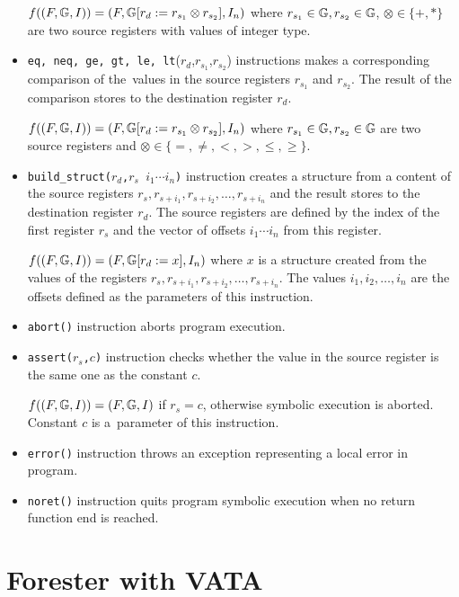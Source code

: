 \begin{itemize}
		$f((F, \mathbb{G}, I)) = (F, \mathbb{G} [r_d := r_{s_1} \otimes r_{s_2}], I_n)$
		where $r_{s_1} \in \mathbb{G}, r_{s_2} \in \mathbb{G}$, $\otimes \in \{+,*\}$
		are two source registers with values of integer type.

	\item {\tt eq, neq, ge, gt, le, lt}($r_d$,$r_{s_1}$,$r_{s_2}$) instructions
		makes a corresponding comparison of the~values in the source registers $r_{s_1}$
		and $r_{s_2}$.
		The result of the comparison stores to the destination register $r_d$.
		
		$f((F, \mathbb{G}, I)) = (F, \mathbb{G} [r_d := r_{s_1} \otimes r_{s_2}], I_n)$
		where $r_{s_1} \in \mathbb{G}, r_{s_2} \in \mathbb{G}$ are two source registers
		and $\otimes \in \{=,\neq, <,>,\leq,\geq\}$.
	
	\item {\tt build\_struct($r_d$,$r_{s}$ $i_1 \cdots i_n$)} instruction creates a structure from a
		content of the source registers $r_s,r_{s+i_1},r_{s+i_2}, \ldots, r_{s+i_n}$
		and the result stores to the destination register $r_d$.
		The source registers are defined by the index of the first register $r_s$ and
		the vector of offsets $i_1 \cdots i_n$ from this register.
		
		$f((F, \mathbb{G}, I)) = (F, \mathbb{G} [r_d := x], I_n)$
		where $x$ is a structure created from the values of the registers $r_s,r_{s+i_1},r_{s+i_2}, \ldots, r_{s+i_n}$.
		The values $i_1, i_2, \ldots, i_n$ are the offsets defined as the parameters of this instruction.
	
	\item {\tt abort()} instruction aborts program execution.
	
	\item {\tt assert($r_s$,$c$)} instruction checks whether the value
		in the source register is the same one as the constant $c$.
		
		$f((F, \mathbb{G}, I)) = (F, \mathbb{G}, I)$ if $r_s = c$, otherwise
		symbolic execution is aborted.
		Constant $c$ is a~parameter of this instruction.
	
	\item {\tt error()} instruction throws an exception representing
		a local error in program.
	
	\item {\tt noret()} instruction quits program symbolic execution when
		no return function end is reached.

\end{itemize}


\chapter{Forester with VATA}
\label{ch:fova}

